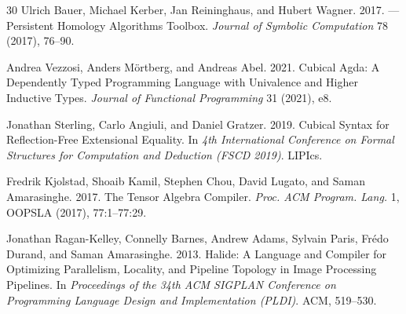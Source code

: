 \documentclass[acmsmall,screen,nonacm]{acmart}
\begin{document}
\begin{thebibliography}{30}
Ulrich Bauer, Michael Kerber, Jan Reininghaus, and Hubert Wagner. 2017.
---Persistent Homology Algorithms Toolbox.
\newblock \emph{Journal of Symbolic Computation} 78 (2017), 76--90.

Andrea Vezzosi, Anders M{\"o}rtberg, and Andreas Abel. 2021.
\newblock Cubical Agda: A Dependently Typed Programming Language with Univalence and Higher Inductive Types.
\newblock \emph{Journal of Functional Programming} 31 (2021), e8.

Jonathan Sterling, Carlo Angiuli, and Daniel Gratzer. 2019.
\newblock Cubical Syntax for Reflection-Free Extensional Equality.
\newblock In \emph{4th International Conference on Formal Structures for Computation and Deduction (FSCD 2019)}. LIPIcs.

Fredrik Kjolstad, Shoaib Kamil, Stephen Chou, David Lugato, and Saman Amarasinghe. 2017.
\newblock The Tensor Algebra Compiler.
\newblock \emph{Proc. ACM Program. Lang.} 1, OOPSLA (2017), 77:1--77:29.

Jonathan Ragan-Kelley, Connelly Barnes, Andrew Adams, Sylvain Paris, Fr{\'e}do Durand, and Saman Amarasinghe. 2013.
\newblock Halide: A Language and Compiler for Optimizing Parallelism, Locality, and Pipeline Topology in Image Processing Pipelines.
\newblock In \emph{Proceedings of the 34th ACM SIGPLAN Conference on Programming Language Design and Implementation (PLDI)}. ACM, 519--530.

\end{thebibliography}
\end{document}
